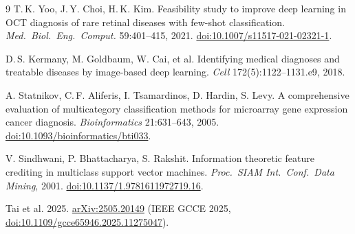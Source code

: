 \documentclass[10pt,a4paper]{article}
\begin{document}
\begin{thebibliography}{9}
T.\,K. Yoo, J.\,Y. Choi, H.\,K. Kim.
Feasibility study to improve deep learning in OCT diagnosis of rare retinal diseases with
few-shot classification.
\emph{Med.\ Biol.\ Eng.\ Comput.} 59:401--415, 2021.
\href{https://doi.org/10.1007/s11517-021-02321-1}{doi:10.1007/s11517-021-02321-1}.

D.\,S. Kermany, M. Goldbaum, W. Cai, et al.
Identifying medical diagnoses and treatable diseases by image-based deep learning.
\emph{Cell} 172(5):1122--1131.e9, 2018.

A. Statnikov, C.\,F. Aliferis, I. Tsamardinos, D. Hardin, S. Levy.
A comprehensive evaluation of multicategory classification methods for microarray gene
expression cancer diagnosis. \emph{Bioinformatics} 21:631--643, 2005.
\href{https://doi.org/10.1093/bioinformatics/bti033}{doi:10.1093/bioinformatics/bti033}.

V. Sindhwani, P. Bhattacharya, S. Rakshit.
Information theoretic feature crediting in multiclass support vector machines.
\emph{Proc.\ SIAM Int.\ Conf.\ Data Mining}, 2001.
\href{https://doi.org/10.1137/1.9781611972719.16}{doi:10.1137/1.9781611972719.16}.

Tai et al. 2025.
\href{https://arxiv.org/abs/2505.20149}{arXiv:2505.20149} (IEEE GCCE 2025,
\href{https://doi.org/10.1109/gcce65946.2025.11275047}{doi:10.1109/gcce65946.2025.11275047}).
\end{thebibliography}
\end{document}
